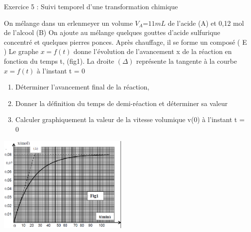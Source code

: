 \documentclass[12pt, french]{article}
\begin{document}
\begin{Box2}{Exercice 5 : Suivi temporel d’une transformation
chimique}

On mélange dans un erlenmeyer un volume $V_A$=$ 11 mL$ de l’acide (A) et 0,12 mol de l’alcool
(B) On ajoute au mélange quelques gouttes
d’acide sulfurique concentré et quelques
pierres ponces. Après chauffage, il se forme un
composé ( E )
Le graphe $x = f (t)$ donne l’évolution de
l’avancement x de la réaction en fonction du
temps t, (fig1).
La droite $(\Delta)$ représente la tangente à la courbe
$x = f (t)$ à l’instant t = 0
\begin{enumerate}
	\item  Déterminer l’avancement final de la
réaction,
\item Donner la définition du temps de demi-réaction et déterminer sa valeur
\item  Calculer graphiquement la valeur de la vitesse volumique v(0) à l’instant t = 0
\end{enumerate}
  \begin{center}
	\includegraphics[width=0.48\textwidth]{./img/ex05.png}
  \end{center}

\end{Box2}
\end{document}

